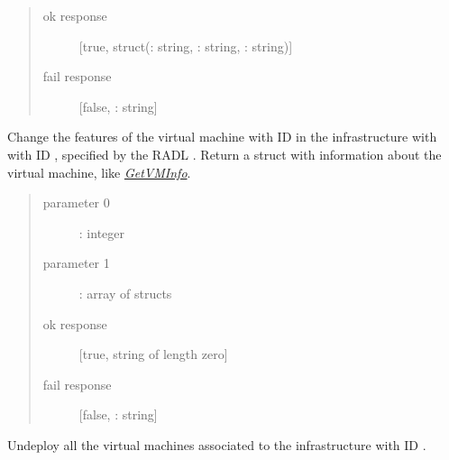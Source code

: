 \documentclass[letterpaper,10pt,english]{sphinxmanual}
\begin{document}
\begin{description}
\begin{quote}
\begin{description}
\item[{ok response}] \leavevmode
{[}true, struct(: string, : string, : string){]}

\item[{fail response}] \leavevmode
{[}false, : string{]}

\end{description}\end{quote}

Change the features of the virtual machine with ID  in the
infrastructure with with ID , specified by the RADL .
Return a struct with information about the virtual machine, like
{\hyperref[xmlrpc:getvminfo-xmlrpc]{\emph{GetVMInfo}}}.

\item[{\code{DestroyInfrastructure}}] \leavevmode\begin{quote}\begin{description}
\item[{parameter 0}] \leavevmode
{}: integer

\item[{parameter 1}] \leavevmode
{}: array of structs

\item[{ok response}] \leavevmode
{[}true, string of length zero{]}

\item[{fail response}] \leavevmode
{[}false, : string{]}

\end{description}\end{quote}

Undeploy all the virtual machines associated to the infrastructure with ID
.

\end{description}
\end{document}
